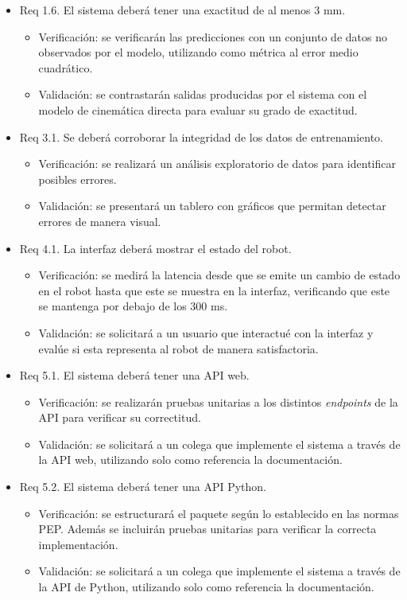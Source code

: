 \documentclass[
11pt, %
]{charter}
\begin{document}
\begin{itemize}
\item Req 1.6. El sistema deberá tener una exactitud de al menos 3 mm.
\begin{itemize}
	\item Verificación: se verificarán las predicciones con un conjunto de datos no observados por el modelo, utilizando como métrica al error medio cuadrático.
	\item Validación: se contrastarán salidas producidas por el sistema con el modelo de cinemática directa para evaluar su grado de exactitud.
\end{itemize}

\item Req 3.1. Se deberá corroborar la integridad de los datos de entrenamiento.
\begin{itemize}
	\item Verificación: se realizará un análisis exploratorio de datos para identificar posibles errores.
	\item Validación: se presentará un tablero con gráficos que permitan detectar errores de manera visual.
\end{itemize}

\item Req 4.1. La interfaz deberá mostrar el estado del robot.
\begin{itemize}
	\item Verificación: se medirá la latencia desde que se emite un cambio de estado en el robot hasta que este se muestra en la interfaz, verificando que este se mantenga por debajo de los 300 ms.
	\item Validación: se solicitará a un usuario que interactué con la interfaz y evalúe si esta representa al robot de manera satisfactoria.
\end{itemize}

\item Req 5.1. El sistema deberá tener una API web.
\begin{itemize}
	\item Verificación: se realizarán pruebas unitarias a los distintos \textit{endpoints} de la API para verificar su correctitud. 
	\item Validación: se solicitará a un colega que implemente el sistema a través de la API web, utilizando solo como referencia la documentación.
\end{itemize}

\item Req 5.2. El sistema deberá tener una API Python.
\begin{itemize}
	\item Verificación: se estructurará el paquete según lo establecido en las normas PEP. Además se incluirán pruebas unitarias para verificar la correcta implementación.
	\item Validación: se solicitará a un colega que implemente el sistema a través de la API de Python, utilizando solo como referencia la documentación.
\end{itemize}


\end{itemize}
\end{document}
